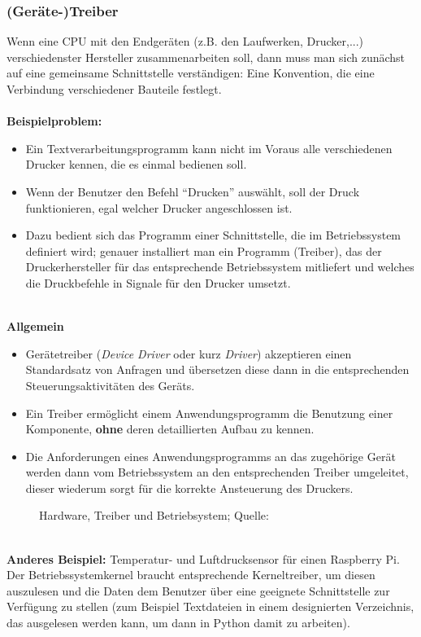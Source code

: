 \subsubsection{(Geräte-)Treiber}
Wenn eine CPU mit den Endgeräten (z.B. den Laufwerken, Drucker,...) verschiedenster Hersteller zusammenarbeiten soll, dann muss man sich zunächst auf eine gemeinsame Schnittstelle verständigen: Eine Konvention, die eine Verbindung verschiedener Bauteile festlegt.\\
~\\
\textbf{Beispielproblem:}
\begin{itemize}
	\item Ein Textverarbeitungsprogramm kann nicht im Voraus alle verschiedenen Drucker kennen, die
es  einmal bedienen soll.
\item Wenn der Benutzer den Befehl ``Drucken'' auswählt, soll der Druck funktionieren, egal welcher Drucker angeschlossen ist.
\item Dazu bedient sich das Programm einer Schnittstelle, die im Betriebssystem definiert wird; genauer installiert man ein Programm (Treiber), das der Druckerhersteller für das entsprechende Betriebssystem mitliefert und welches die Druckbefehle in Signale für den Drucker umsetzt.
\end{itemize}
~\\
\textbf{Allgemein}
\begin{itemize}
	\item  Gerätetreiber (\textit{Device Driver }oder kurz \textit{Driver}) akzeptieren einen Standardsatz von Anfragen und übersetzen diese dann in die entsprechenden Steuerungsaktivitäten des Geräts.
\item Ein Treiber ermöglicht einem Anwendungsprogramm die Benutzung einer
Komponente, \textbf{ohne} deren detaillierten Aufbau zu kennen.
\item Die Anforderungen eines
Anwendungsprogramms an das zugehörige Gerät werden dann vom Betriebssystem an den entsprechenden Treiber umgeleitet, dieser wiederum sorgt für die korrekte Ansteuerung des
Druckers.
\end{itemize}
%
\begin{figure}[h!]
	\centering
	\caption[Treiber]{Hardware, Treiber und Betriebsystem; Quelle: \cite[Abb. 1.27]{gumm1}}
	\label{fig:treiber}
\end{figure}

%
~\\
\textbf{Anderes Beispiel:} Temperatur- und Luftdrucksensor für einen Raspberry Pi. Der Betriebssystemkernel braucht entsprechende Kerneltreiber, um diesen auszulesen und die Daten dem Benutzer über eine geeignete Schnittstelle zur Verfügung zu stellen (zum Beispiel Textdateien in einem designierten Verzeichnis, das ausgelesen werden kann, um dann in Python damit zu arbeiten).
%
%

